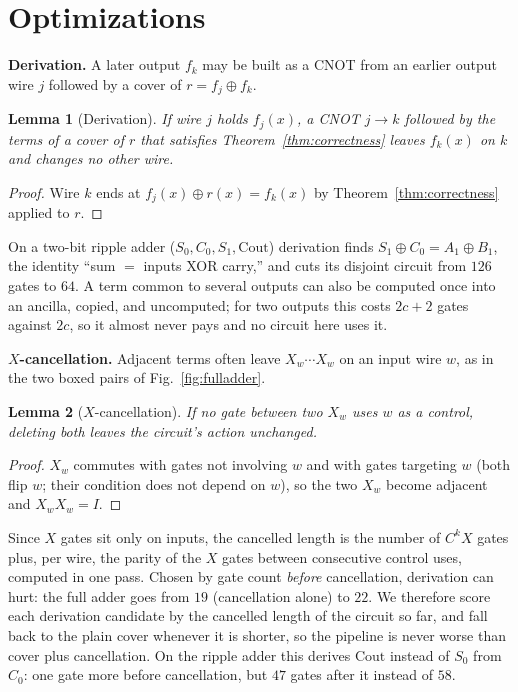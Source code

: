 \documentclass[conference]{IEEEtran}
\theoremstyle{plain}
\newtheorem{lemma}{Lemma}
\begin{document}
\section{Optimizations}
\textbf{Derivation.} A later output $f_k$ may be built as a CNOT from an
earlier output wire $j$ followed by a cover of $r=f_j\oplus f_k$.
\begin{lemma}[Derivation]
\label{lem:derive}
If wire $j$ holds $f_j(x)$, a CNOT $j\to k$ followed by the terms of a
cover of $r$ that satisfies Theorem~\ref{thm:correctness} leaves
$f_k(x)$ on $k$ and changes no other wire.
\end{lemma}
\begin{proof}
Wire $k$ ends at $f_j(x)\oplus r(x)=f_k(x)$ by
Theorem~\ref{thm:correctness} applied to $r$.
\end{proof}
On a two-bit ripple adder ($S_0,C_0,S_1,\mathrm{Cout}$) derivation finds
$S_1\oplus C_0=A_1\oplus B_1$, the identity ``sum $=$ inputs XOR carry,''
and cuts its disjoint circuit from $126$ gates to $64$. A term common to several outputs can also
be computed once into an ancilla, copied, and uncomputed; for two
outputs this costs $2c+2$ gates against $2c$, so it almost never pays
and no circuit here uses it.


\textbf{$X$-cancellation.} Adjacent terms often leave $X_w\cdots X_w$ on
an input wire $w$, as in the two boxed pairs of Fig.~\ref{fig:fulladder}.
\begin{lemma}[$X$-cancellation]
\label{lem:xcancel}
If no gate between two $X_w$ uses $w$ as a control, deleting both leaves
the circuit's action unchanged.
\end{lemma}
\begin{proof}
$X_w$ commutes with gates not involving $w$ and with gates targeting
$w$ (both flip $w$; their condition does not depend on $w$), so the two
$X_w$ become adjacent and $X_wX_w=I$.
\end{proof}
Since $X$ gates sit only on inputs, the cancelled length is the number
of $C^kX$ gates plus, per wire, the parity of the $X$ gates between
consecutive control uses, computed in one pass. Chosen by gate count
\emph{before} cancellation, derivation can hurt: the full adder goes
from $19$ (cancellation alone) to $22$. We therefore score each
derivation candidate by the cancelled length of the circuit so far, and
fall back to the plain cover whenever it is shorter, so the pipeline is
never worse than cover plus cancellation. On the ripple adder this
derives $\mathrm{Cout}$ instead of $S_0$ from $C_0$: one gate more before
cancellation, but $47$ gates after it instead of $58$.
\end{document}
